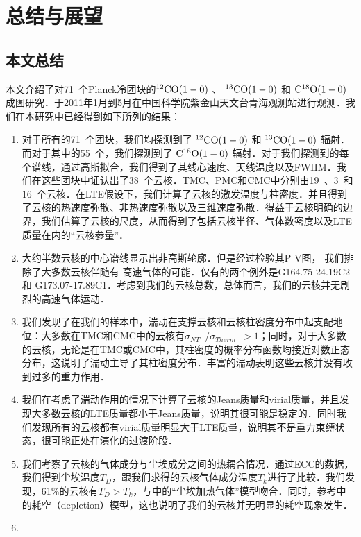 \documentclass[UTF8, nocolorlinks]{pkuthss}
\newcommand{\coaa}{$\rm^{12}CO(1-0)$ }
\newcommand{\cobb}{$\rm^{13}CO(1-0)$ }
\newcommand{\cocc}{$\rm C^{18}O(1-0)$ }
\newcommand{\sigmath}{$\sigma _{Therm}$\ }
\newcommand{\sigmant}{$\sigma _{NT}$\ }
\newcommand{\numsou}{71\ }
\newcommand{\numcore}{38\ }
\newcommand{\numcoretmc}{19\ }
\newcommand{\numcorepmc}{3\ }
\newcommand{\numcorecmc}{16\ }
\newcommand{\numcocc}{55\ }
\begin{document}
\chapter{总结与展望}
		
	\section{本文总结}

		本文介绍了对\numsou 个Planck冷团块的\coaa 、 \cobb 和 \cocc 成图研究．于2011年1月到5月在中国科学院紫金山天文台青海观测站进行观测．我们在本研究中已经得到如下所列的结果：
	    \begin{enumerate}
	     \item 
	     	对于所有的\numsou 个团块，我们均探测到了 \coaa 和 \cobb 辐射．而对于其中的\numcocc 个，我们探测到了 \cocc 辐射．对于我们探测到的每个谱线，通过高斯拟合，我们得到了其线心速度、天线温度以及FWHM．我们在这些团块中证认出了\numcore 个云核．TMC、PMC和CMC中分别由\numcoretmc 、\numcorepmc 和\numcorecmc 个云核．在LTE假设下，我们计算了云核的激发温度与柱密度．并且得到了云核的热速度弥散、非热速度弥散以及三维速度弥散．得益于云核明确的边界，我们估算了云核的尺度，从而得到了包括云核半径、气体数密度以及LTE质量在内的“云核参量”．
	     \item
	     	大约半数云核的中心谱线显示出非高斯轮廓．但是经过检验其P-V图， 我们排除了大多数云核伴随有 高速气体的可能．仅有的两个例外是G164.75-24.19C2 和 G173.07-17.89C1．考虑到我们的云核总数，总体而言，我们的云核并无剧烈的高速气体运动．
	    \item 
	    	我们发现了在我们的样本中，湍动在支撑云核和云核柱密度分布中起支配地位：大多数在TMC和CMC中的云核有\sigmant/\sigmath$>1$；同时，对于大多数的云核，无论是在TMC或CMC中，其柱密度的概率分布函数均接近对数正态分布，这说明了湍动主导了其柱密度分布．丰富的湍动表明这些云核并没有收到过多的重力作用．
	    \item 
	    	我们在考虑了湍动作用的情况下计算了云核的Jeans质量和virial质量，并且发现大多数云核的LTE质量都小于Jeans质量，说明其很可能是稳定的．同时我们发现所有的云核都有virial质量明显大于LTE质量，说明其不是重力束缚状态，很可能正处在演化的过渡阶段．
	    \item
	    	我们考察了云核的气体成分与尘埃成分之间的热耦合情况．通过ECC的数据，我们得到尘埃温度$T_D$，跟我们求得的云核气体成分温度$T_k$进行了比较．我们发现，61\%的云核有$T_D>T_k$，与\parencite{1974ApJ...189..441G}中的“尘埃加热气体”模型吻合．同时，参考\parencite{2001ApJ...557..736G}中的耗空（depletion）模型，这也说明了我们的云核并无明显的耗空现象发生．
	    \item

\end{enumerate}
\end{document}
